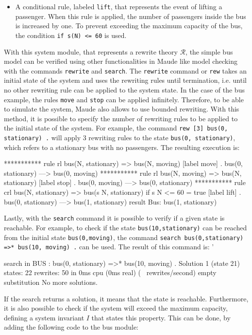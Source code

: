 \begin{example}
\begin{itemize}
    \item A conditional rule, labeled \texttt{lift}, that represents the event of lifting a passenger. When this rule is applied, the number of passengers inside the bus is increased by one. To prevent exceeding the maximum capacity of the bus, the condition \texttt{if s(N) <= 60} is used. 
\end{itemize}
With this system module, that represents a rewrite theory $\mathscr{R}$, the simple bus model can be verified using other functionalities in Maude like model checking with the commands \texttt{rewrite} and \texttt{search}. The \texttt{rewrite} command or \texttt{rew} takes an initial state of the system and uses the rewriting rules until termination, i.e. until no other rewriting rule can be applied to the system state. In the case of the bus example, the rules \texttt{move} and \texttt{stop} can be applied infinitely. Therefore, to be able to simulate the system, Maude also allows to use bounded rewriting. With this method, it is possible to specify the number of rewriting rules to be applied to the initial state of the system. For example, the command \texttt{rew [3] bus(0, stationary) .} will apply 3 rewriting rules to the state \texttt{bus(0, stationary)}, which refers to a stationary bus with no passengers. The resulting execution is:
\\
\begin{maude2}
*********** rule
rl bus(N, stationary) => bus(N, moving) [label move] .
bus(0, stationary)
--->
bus(0, moving)
*********** rule
rl bus(N, moving) => bus(N, stationary) [label stop] .
bus(0, moving)
--->
bus(0, stationary)
*********** rule
crl bus(N, stationary) => bus(s N, stationary) 
                          if s N <= 60 = true [label lift] .
bus(0, stationary)
--->
bus(1, stationary)
result Bus: bus(1, stationary)
\end{maude2}
Lastly, with the \texttt{search} command it is possible to verify if a given state is reachable. For example, to check if the state \texttt{bus(10,stationary)} can be reached from the initial state \texttt{bus(0,moving)}, the command \texttt{search bus(0,stationary) =>* bus(10, moving) .}  can be used. The result of this command is:
'\\
\begin{maude2}
search in BUS : bus(0, stationary) =>* bus(10, moving) .
Solution 1 (state 21)
states: 22  rewrites: 50 in 0ms cpu (0ms real) (~ rewrites/second)
empty substitution
No more solutions.
\end{maude2}
If the search returns a solution, it means that the state is reachable. Furthermore, it is also possible to check if the system will exceed the maximum capacity, defining a system invariant $I$ that states this property. This can be done, by adding the following code to the bus module:

\end{example}
